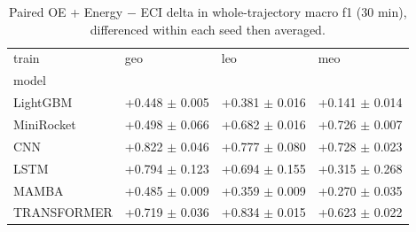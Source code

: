 \begin{table}
\caption{Paired OE + Energy $-$ ECI delta in whole-trajectory macro f1 (30 min), differenced within each seed then averaged.}
\label{tab:total_featdelta_f1_phys}
\begin{tabular}{llll}
\toprule
train & geo & leo & meo \\
model &  &  &  \\
\midrule
LightGBM & +0.448 $\pm$ 0.005 & +0.381 $\pm$ 0.016 & +0.141 $\pm$ 0.014 \\
MiniRocket & +0.498 $\pm$ 0.066 & +0.682 $\pm$ 0.016 & +0.726 $\pm$ 0.007 \\
CNN & +0.822 $\pm$ 0.046 & +0.777 $\pm$ 0.080 & +0.728 $\pm$ 0.023 \\
LSTM & +0.794 $\pm$ 0.123 & +0.694 $\pm$ 0.155 & +0.315 $\pm$ 0.268 \\
MAMBA & +0.485 $\pm$ 0.009 & +0.359 $\pm$ 0.009 & +0.270 $\pm$ 0.035 \\
TRANSFORMER & +0.719 $\pm$ 0.036 & +0.834 $\pm$ 0.015 & +0.623 $\pm$ 0.022 \\
\bottomrule
\end{tabular}
\end{table}
